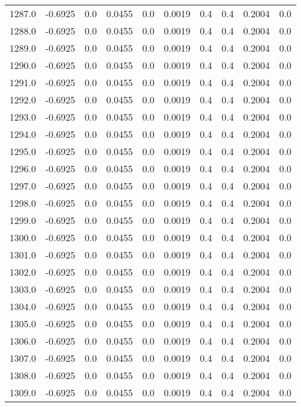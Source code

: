 \begin{longtable}{lrrrrrrrrr}
1287.0 & -0.6925 & 0.0 & 0.0455 & 0.0 & 0.0019 & 0.4 & 0.4 & 0.2004 & 0.0 \\
1288.0 & -0.6925 & 0.0 & 0.0455 & 0.0 & 0.0019 & 0.4 & 0.4 & 0.2004 & 0.0 \\
1289.0 & -0.6925 & 0.0 & 0.0455 & 0.0 & 0.0019 & 0.4 & 0.4 & 0.2004 & 0.0 \\
1290.0 & -0.6925 & 0.0 & 0.0455 & 0.0 & 0.0019 & 0.4 & 0.4 & 0.2004 & 0.0 \\
1291.0 & -0.6925 & 0.0 & 0.0455 & 0.0 & 0.0019 & 0.4 & 0.4 & 0.2004 & 0.0 \\
1292.0 & -0.6925 & 0.0 & 0.0455 & 0.0 & 0.0019 & 0.4 & 0.4 & 0.2004 & 0.0 \\
1293.0 & -0.6925 & 0.0 & 0.0455 & 0.0 & 0.0019 & 0.4 & 0.4 & 0.2004 & 0.0 \\
1294.0 & -0.6925 & 0.0 & 0.0455 & 0.0 & 0.0019 & 0.4 & 0.4 & 0.2004 & 0.0 \\
1295.0 & -0.6925 & 0.0 & 0.0455 & 0.0 & 0.0019 & 0.4 & 0.4 & 0.2004 & 0.0 \\
1296.0 & -0.6925 & 0.0 & 0.0455 & 0.0 & 0.0019 & 0.4 & 0.4 & 0.2004 & 0.0 \\
1297.0 & -0.6925 & 0.0 & 0.0455 & 0.0 & 0.0019 & 0.4 & 0.4 & 0.2004 & 0.0 \\
1298.0 & -0.6925 & 0.0 & 0.0455 & 0.0 & 0.0019 & 0.4 & 0.4 & 0.2004 & 0.0 \\
1299.0 & -0.6925 & 0.0 & 0.0455 & 0.0 & 0.0019 & 0.4 & 0.4 & 0.2004 & 0.0 \\
1300.0 & -0.6925 & 0.0 & 0.0455 & 0.0 & 0.0019 & 0.4 & 0.4 & 0.2004 & 0.0 \\
1301.0 & -0.6925 & 0.0 & 0.0455 & 0.0 & 0.0019 & 0.4 & 0.4 & 0.2004 & 0.0 \\
1302.0 & -0.6925 & 0.0 & 0.0455 & 0.0 & 0.0019 & 0.4 & 0.4 & 0.2004 & 0.0 \\
1303.0 & -0.6925 & 0.0 & 0.0455 & 0.0 & 0.0019 & 0.4 & 0.4 & 0.2004 & 0.0 \\
1304.0 & -0.6925 & 0.0 & 0.0455 & 0.0 & 0.0019 & 0.4 & 0.4 & 0.2004 & 0.0 \\
1305.0 & -0.6925 & 0.0 & 0.0455 & 0.0 & 0.0019 & 0.4 & 0.4 & 0.2004 & 0.0 \\
1306.0 & -0.6925 & 0.0 & 0.0455 & 0.0 & 0.0019 & 0.4 & 0.4 & 0.2004 & 0.0 \\
1307.0 & -0.6925 & 0.0 & 0.0455 & 0.0 & 0.0019 & 0.4 & 0.4 & 0.2004 & 0.0 \\
1308.0 & -0.6925 & 0.0 & 0.0455 & 0.0 & 0.0019 & 0.4 & 0.4 & 0.2004 & 0.0 \\
1309.0 & -0.6925 & 0.0 & 0.0455 & 0.0 & 0.0019 & 0.4 & 0.4 & 0.2004 & 0.0 \\

\end{longtable}
